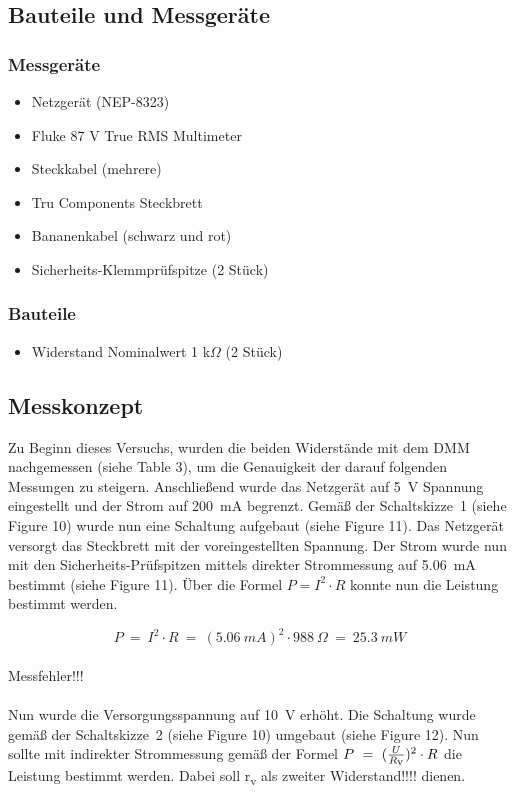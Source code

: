 \documentclass[a4paper,12pt]{article}
\begin{document}
\subsection{Bauteile und Messgeräte}
\subsubsection*{Messgeräte}
\begin{itemize}
\item Netzgerät (NEP-8323)
\item Fluke 87 V True RMS Multimeter
\item Steckkabel (mehrere)
\item Tru Components Steckbrett
\item Bananenkabel (schwarz und rot)
\item Sicherheits-Klemmprüfspitze (2 Stück)
\end{itemize}

\subsubsection*{Bauteile}
\begin{itemize}
\item Widerstand Nominalwert 1 k$\Omega$ (2 Stück)
\end{itemize}
\newpage

\subsection{Messkonzept}
Zu Beginn dieses Versuchs, wurden die beiden Widerstände mit dem DMM nachgemessen (siehe Table 3), um die Genauigkeit der darauf folgenden Messungen zu steigern. Anschließend wurde das Netzgerät auf 5~V Spannung eingestellt und der Strom auf 200~mA begrenzt. Gemäß der Schaltskizze~1 (siehe Figure 10) wurde nun eine Schaltung aufgebaut (siehe Figure 11). Das Netzgerät versorgt das Steckbrett mit der voreingestellten Spannung. Der Strom wurde nun mit den Sicherheits-Prüfspitzen mittels direkter Strommessung auf 5.06~mA bestimmt (siehe Figure 11). Über die Formel \(P = I^2 \cdot R \) konnte nun die Leistung bestimmt werden.

\[
P ~=~ I^2 \cdot R ~=~ (5.06~mA)^2 \cdot 988~\Omega ~=~ 25.3~mW
\]\\

\noindent Messfehler!!!\\\\
Nun wurde die Versorgungsspannung auf 10~V erhöht. Die Schaltung wurde gemäß der Schaltskizze~2 (siehe Figure 10) umgebaut (siehe Figure 12). Nun sollte mit indirekter Strommessung gemäß der Formel \(P ~=~  (\frac{U}{R\textsubscript{v}})^2 \cdot R\) die Leistung bestimmt werden. Dabei soll r\textsubscript{v} als zweiter Widerstand!!!! dienen.
\end{document}
